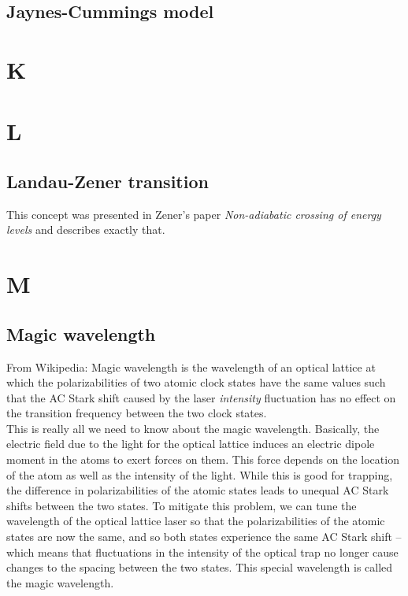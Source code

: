 \documentclass{book}
\theoremstyle{definition}
\begin{document}
\section*{Jaynes-Cummings model}

\chapter*{K}
\chapter*{L}


\section*{Landau-Zener transition}


This concept was presented in Zener's paper \textit{Non-adiabatic crossing of energy levels} \cite{zener1932non} and describes exactly that. 




\chapter*{M}



\section*{Magic wavelength}



From Wikipedia: Magic wavelength is the wavelength of an optical lattice at which the polarizabilities of two atomic clock states have the same values such that the AC Stark shift caused by the laser \textit{intensity} fluctuation has no effect on the transition frequency between the two clock states.\\


This is really all we need to know about the magic wavelength. Basically, the electric field due to the light for the optical lattice induces an electric dipole moment in the atoms to exert forces on them. This force depends on the location of the atom as well as the intensity of the light. While this is good for trapping, the difference in polarizabilities of the atomic states leads to unequal AC Stark shifts between the two states. To mitigate this problem, we can tune the wavelength of the optical lattice laser so that the polarizabilities of the atomic states are now the same, and so both states experience the same AC Stark shift -- which means that fluctuations in the intensity of the optical trap no longer cause changes to the spacing between the two states. This special wavelength is called the magic wavelength. 
\end{document}
